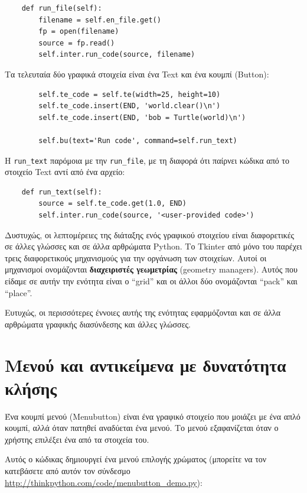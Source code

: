 \documentclass[10pt]{book}
\begin{document}
\begin{verbatim}
    def run_file(self):
        filename = self.en_file.get()
        fp = open(filename)
        source = fp.read()
        self.inter.run_code(source, filename)
\end{verbatim}
%
Τα τελευταία δύο γραφικά στοιχεία είναι ένα Text και ένα κουμπί (Button):

\begin{verbatim}
        self.te_code = self.te(width=25, height=10)
        self.te_code.insert(END, 'world.clear()\n')
        self.te_code.insert(END, 'bob = Turtle(world)\n')

        self.bu(text='Run code', command=self.run_text)
\end{verbatim}
%
Η \verb"run_text" παρόμοια με την \verb"run_file", με τη διαφορά ότι 
παίρνει κώδικα από το στοιχείο Text αντί από ένα αρχείο:

\begin{verbatim}
    def run_text(self):
        source = self.te_code.get(1.0, END)
        self.inter.run_code(source, '<user-provided code>')
\end{verbatim}
%
Δυστυχώς, οι λεπτομέρειες της διάταξης ενός γραφικού στοιχείου είναι διαφορετικές σε άλλες
γλώσσες και σε άλλα αρθρώματα Python. Το Tkinter από μόνο του παρέχει τρεις διαφορετικούς
μηχανισμούς για την οργάνωση των στοιχείων.  Αυτοί οι μηχανισμοί ονομάζονται 
{\bf διαχειριστές γεωμετρίας} (geometry managers).  Αυτός που είδαμε σε αυτήν την ενότητα είναι
ο ``grid'' και οι άλλοι δύο ονομάζονται ``pack'' και ``place''.

Ευτυχώς, οι περισσότερες έννοιες αυτής της ενότητας εφαρμόζονται και σε άλλα αρθρώματα 
γραφικής διασύνδεσης και άλλες γλώσσες.



\section{Μενού και αντικείμενα με δυνατότητα κλήσης}

Ένα κουμπί μενού (Menubutton) είναι ένα γραφικό στοιχείο που μοιάζει με ένα απλό
κουμπί, αλλά όταν πατηθεί αναδύεται ένα μενού.  Το μενού εξαφανίζεται όταν ο χρήστης επιλέξει 
ένα από τα στοιχεία του.

Αυτός ο κώδικας δημιουργεί ένα μενού επιλογής χρώματος (μπορείτε να τον κατεβάσετε από αυτόν τον σύνδεσμο
\url{http://thinkpython.com/code/menubutton_demo.py}):
\end{document}
